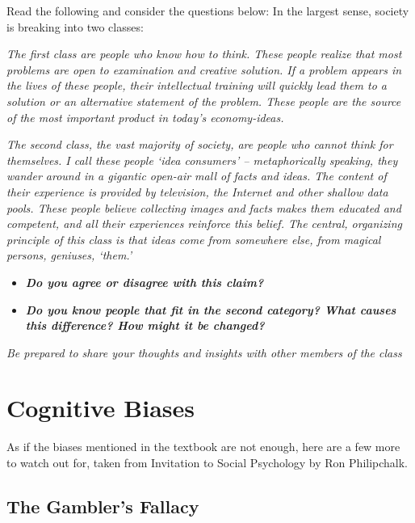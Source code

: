 \documentclass[
]{book}
\providecommand{\tightlist}{%
  \setlength{\itemsep}{0pt}\setlength{\parskip}{0pt}}
\begin{document}
\begin{reflect}
Read the following and consider the questions below:
In the largest sense, society is breaking into two classes:

\emph{The first class are people who know how to think. These people realize that most problems are open to examination and creative solution. If a problem appears in the lives of these people, their intellectual training will quickly lead them to a solution or an alternative statement of the problem. These people are the source of the most important product in today's economy-ideas.}

\emph{The second class, the vast majority of society, are people who cannot think for themselves. I call these people `idea consumers' -- metaphorically speaking, they wander around in a gigantic open-air mall of facts and ideas. The content of their experience is provided by television, the Internet and other shallow data pools. These people believe collecting images and facts makes them educated and competent, and all their experiences reinforce this belief. The central, organizing principle of this class is that ideas come from somewhere else, from magical persons, geniuses, `them.'}

\begin{itemize}
\tightlist
\item
  \textbf{\emph{Do you agree or disagree with this claim?}}
\item
  \textbf{\emph{Do you know people that fit in the second category? What causes this difference? How might it be changed?}}
\end{itemize}

\emph{Be prepared to share your thoughts and insights with other members of the class}
\end{reflect}

\hypertarget{cognitive-biases}{%
\section{Cognitive Biases}\label{cognitive-biases}}

As if the biases mentioned in the textbook are not enough, here are a few more to watch out for, taken from Invitation to Social Psychology by Ron Philipchalk.

\hypertarget{the-gamblers-fallacy}{%
\subsection*{The Gambler's Fallacy}\label{the-gamblers-fallacy}}
\end{document}
